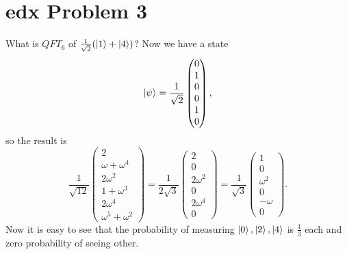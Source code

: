 \documentclass[10pt]{article}
\begin{document}
\section*{edx Problem 3}
What is $QFT_6$ of $\frac{1}{\sqrt{2}} (\ket{1} + \ket{4})$? Now we have a state
\[
\ket{\psi} = \frac{1}{\sqrt{2}}
\begin{pmatrix}
0 \\
1 \\
0 \\
0 \\
1 \\
0
\end{pmatrix},
\]
so the result is
\[
\frac{1}{\sqrt{12}}
\begin{pmatrix}
2 \\
\omega + \omega^{4} \\
2\omega^{2} \\
1 + \omega^{3} \\
2\omega^{4} \\
\omega^{5} + \omega^{2}
\end{pmatrix}
= 
\frac{1}{2\sqrt{3}}
\begin{pmatrix}
2 \\ 0 \\ 2 \omega^{2} \\ 0 \\ 2 \omega^4 \\ 0
\end{pmatrix}
= 
\frac{1}{\sqrt{3}}
\begin{pmatrix}
1 \\ 0 \\ \omega^{2} \\ 0 \\ -\omega \\ 0
\end{pmatrix}.
\]
Now it is easy to see that the probability of measuring $\ket{0}, \ket{2}, \ket{4}$ is $\frac{1}{3}$ each and zero probability of seeing other.
\end{document}
